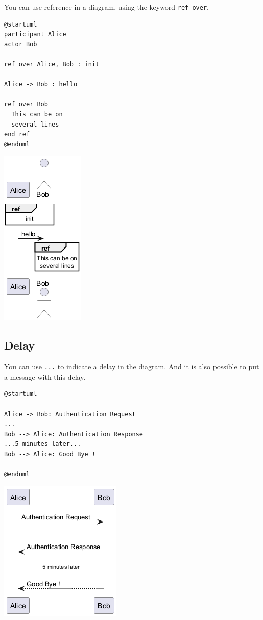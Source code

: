 You can use reference in a diagram, using the keyword \texttt{ref over}.
\begin{verbatim}
@startuml
participant Alice
actor Bob

ref over Alice, Bob : init

Alice -> Bob : hello

ref over Bob
  This can be on
  several lines
end ref
@enduml
\end{verbatim}
\begin{center}
\includegraphics[scale=0.60]{imgw/img-659ade911a29deec1f9f7f00fcf241ee.png}
\end{center}


%
%
\subsection{Delay}


You can use \texttt{...} to indicate a delay in the diagram.
And it is also possible to put a message with this delay.
\begin{verbatim}
@startuml

Alice -> Bob: Authentication Request
...
Bob --> Alice: Authentication Response
...5 minutes later...
Bob --> Alice: Good Bye !

@enduml
\end{verbatim}
\begin{center}
\includegraphics[scale=0.60]{imgw/img-8d667df4fc22a9d08937418e51baeaf5.png}
\end{center}
%
%
